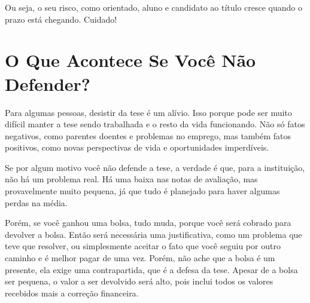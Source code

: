 Ou seja, o seu risco, como orientado, aluno e candidato ao título cresce quando o prazo está chegando. Cuidado!

\section{O Que Acontece Se Você Não Defender?}

Para algumas pessoas, desistir da tese é um alívio. Isso porque pode ser muito difícil manter a tese sendo trabalhada e o resto da vida funcionando. Não só fatos negativos, como parentes doentes e problemas no emprego, mas também fatos positivos, como novas perspectivas de vida e oportunidades imperdíveis.

Se por algum motivo você não defende a tese, a verdade é que, para a instituição, não há um problema real. Há uma baixa nas notas de avaliação, mas provavelmente muito pequena, já que tudo é planejado para haver algumas perdas na média.

Porém, se você ganhou uma bolsa, tudo muda, porque você será cobrado para devolver a bolsa. Então será necessária uma justificativa, como um problema que teve que resolver, ou simplesmente aceitar o fato que você seguiu por outro caminho e é melhor pagar de uma vez. Porém, não ache que a bolsa é um presente, ela exige uma contrapartida, que é a defesa da tese. Apesar de a bolsa ser pequena, o valor a ser devolvido será alto, pois inclui todos os valores recebidos mais a correção financeira.






